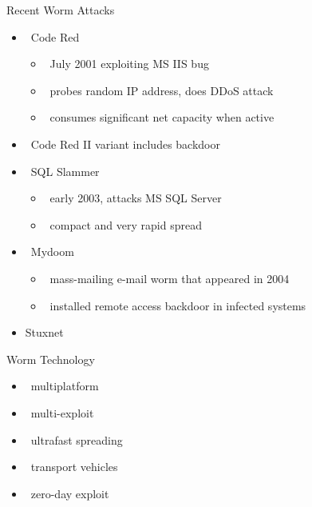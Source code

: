 \documentclass{beamer}
\begin{document}
\begin{frame}{Recent Worm Attacks}
  \begin{itemize}
  \item  Code Red 
    \begin{itemize}
    \item  July 2001 exploiting MS IIS bug 
    \item  probes random IP address, does DDoS attack 
    \item  consumes significant net capacity when active 
    \end{itemize}
  \item  Code Red II variant includes backdoor 
  \item  SQL Slammer 
    \begin{itemize}
    \item  early 2003, attacks MS SQL Server 
    \item  compact and very rapid spread 
    \end{itemize}
  \item  Mydoom 
    \begin{itemize}
    \item  mass-mailing e-mail worm that appeared in 2004 
    \item  installed remote access backdoor in infected systems 
    \end{itemize}
  \item Stuxnet
  \end{itemize}
\end{frame}

\begin{frame}{Worm Technology}
  \begin{itemize}
  \item  multiplatform 
  \item  multi-exploit 
  \item  ultrafast spreading 
  \item  transport vehicles 
  \item  zero-day exploit
  \end{itemize}
\end{frame}
\end{document}
